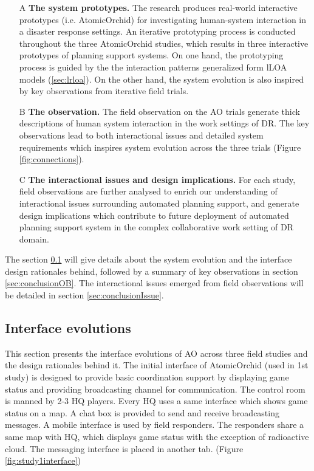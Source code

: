 \begin{enumerate}
  \item[A] \textbf{The system prototypes.} The research produces real-world interactive prototypes (i.e. AtomicOrchid) for investigating human-system interaction in a disaster response settings. An iterative prototyping process is conducted throughout the three AtomicOrchid studies, which results in three interactive prototypes of planning support systems. On one hand, the prototyping process is guided by the the interaction patterns generalized form l{LOA} models (\ref{sec:lrloa}). On the other hand, the system evolution is also inspired by key observations from iterative field trials. 
  
  \item[B] \textbf{The observation.} The field observation on the \ac{AO} trials generate thick descriptions of human system interaction in the work settings of \ac{DR}. The key observations lead to both interactional issues and detailed system requirements which inspires system evolution across the three trials (Figure \ref{fig:connections}).
  
  \item[C] \textbf{The interactional issues and design implications.} For each study, field observations are further analysed to enrich our understanding of interactional issues surrounding automated planning support, and generate design implications which contribute to future deployment of automated planning support system in the complex collaborative work setting of DR domain. 
\end{enumerate}

The section \ref{sec:conclusionIE}  will give details about the system evolution and the interface design rationales behind, followed by a summary of key observations in section \ref{sec:conclusionOB}. The interactional issues emerged from field observations will be detailed in section \ref{sec:conclusionIssue}. \\



\subsection{Interface evolutions}\label{sec:conclusionIE}
This section presents the interface evolutions of \acf{AO} across three field studies and the design rationales behind it. The initial interface of AtomicOrchid (used in 1st study) is designed to provide basic coordination support by displaying game status and providing broadcasting channel for communication. The control room is manned by 2-3 HQ players. Every HQ uses a same interface which shows game status on a map. A chat box is provided to send and receive broadcasting messages. A mobile interface is used by field responders. The responders share a same map with HQ, which displays game status with the exception of radioactive cloud. The messaging interface is placed in another tab. (Figure \ref{fig:study1interface})\\ 

